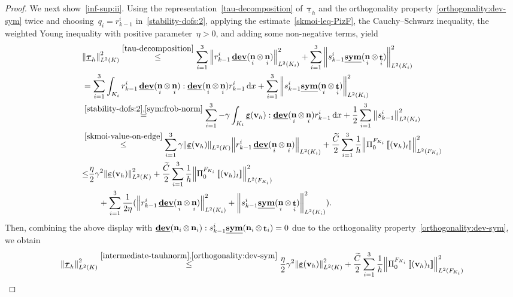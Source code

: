 \documentclass[a4paper,twoside,10pt]{article}
\theoremstyle{plain}
\theoremstyle{remark}
\theoremstyle{definition}
\numberwithin{equation}{section}
\numberwithin{figure}{section}
\newcommand{\Norm}[1]{{\left\|{#1} \right\|}}
\newcommand{\jump}[1]{\left[\!\left[#1\right]\!\right]}
\newcommand{\K}{K}
\newcommand{\F}{F}
\newcommand{\taubfh}{\underline{\boldsymbol{\tau}}_h}
\newcommand{\vbfh}{\mathbf{v}_h}
\DeclareMathOperator{\dev}{\underline{\mathbf{dev}}}
\newcommand{\sym}{\underline{\bf{sym}}}
\DeclareMathOperator{\norm}{\bf{n}}
\DeclareMathOperator{\tang}{\bf{t}}
\newcommand{\tangscalar}{t}
\newcommand{\Ltwo}{L^2}
\newcommand{\dx}{\, \mathrm{d}x}
\newcommand{\epsbfun}{\underline{\boldsymbol{\varepsilon}}}
\newcommand{\rkmoi}{r_{k-1}^i}
\newcommand{\skmoi}{s_{k-1}^i}
\newcommand{\Ki}{{\K_i}}
\newcommand{\Fi}{{\F_{\Ki}}}
\newcommand{\normi}{\norm_i}
\newcommand{\tangi}{\tang_i}
\newcommand{\PizFi}{\Pi_0^{\Fi}}
\newcommand{\Ctilde}{\widetilde{C}}
\newcommand{\qi}{q_{i}}
\begin{document}
\begin{proof}
We next show~\eqref{inf-sup:ii}.
Using the representation~\eqref{tau-decomposition} of~$\taubfh$
and the orthogonality property~\eqref{orthogonality:dev-sym} twice and
choosing~$\qi = \rkmoi$ in~\eqref{stability-dofs:2},
applying
the estimate~\eqref{skmoi-leq-PizF},
the Cauchy--Schwarz inequality,
the weighted Young inequality with positive parameter~$\eta >0$,
and adding some non-negative terms,
yield
\begin{equation} \label{intermediate-tauhnorm}
\begin{split}
&\Norm{\taubfh}_{\Ltwo(\K)}^2
\overset{\eqref{tau-decomposition}}{\leq}
\sum_{i=1}^3 \Norm{\rkmoi\dev(\normi\otimes\normi)}_{\Ltwo(\Ki)}^2 + \sum_{i=1}^3\Norm{\skmoi\sym(\normi\otimes\tangi)}_{\Ltwo(\Ki)}^2 \\
&= \sum_{i=1}^3 \int_{\Ki}\rkmoi\dev(\normi\otimes\normi):\dev(\normi\otimes\normi)\rkmoi\dx + \sum_{i=1}^3\Norm{\skmoi\sym(\normi\otimes\tangi)}_{\Ltwo(\Ki)}^2 \\
&\overset{\eqref{stability-dofs:2},\eqref{sym:frob-norm}}{=}
\sum_{i=1}^3 - \gamma\int_{\Ki} \epsbfun(\vbfh):\dev(\normi\otimes\normi)\rkmoi \dx
    + \frac12\sum_{i=1}^3 \Norm{\skmoi}_{\Ltwo(\Ki)}^2 \\
&\overset{\eqref{skmoi-value-on-edge}}{\leq}
\sum_{i=1}^3 \gamma\Norm{\epsbfun(\vbfh)}_{\Ltwo(\K)} \Norm{\rkmoi \dev(\normi\otimes\normi)}_{\Ltwo(\Ki)}
    +  \frac{\Ctilde}{2}\sum_{i=1}^3\frac{1}{h} \Norm{\PizFi\jump{(\vbfh)_{\tangscalar}}}^2_{\Ltwo(\Fi)} \\
&{\leq}
\frac{\eta}{2}\gamma^2\Norm{\epsbfun(\vbfh)}^2_{\Ltwo(\K)}
    +  \frac{\Ctilde}{2}\sum_{i=1}^3 \frac{1}{h} \Norm{\PizFi\jump{(\vbfh)_{\tangscalar}}}^2_{\Ltwo(\Fi)} \\
&\qquad    + \sum_{i=1}^3 \frac{1}{2\eta}(\Norm{\rkmoi \dev(\normi\otimes\normi)}^2_{\Ltwo(\Ki)}
        + \Norm{\skmoi \sym(\normi\otimes\tangi)}^2_{\Ltwo(\Ki)}).
\end{split}
\end{equation}
Then,
combining the above display
with
$\dev(\normi\otimes\normi) : \skmoi \sym(\normi\otimes\tangi)= 0$
due to the orthogonality property~\eqref{orthogonality:dev-sym},
we obtain
\begin{equation*}
\begin{split}
\Norm{\taubfh}_{\Ltwo(\K)}^2
&\overset{\eqref{intermediate-tauhnorm},\eqref{orthogonality:dev-sym}}{\leq}
\frac{\eta}{2}\gamma^2\Norm{\epsbfun(\vbfh)}^2_{\Ltwo(\K)}
    +  \frac{\Ctilde}{2}\sum_{i=1}^3 \frac{1}{h} \Norm{\PizFi\jump{(\vbfh)_{\tangscalar}}}^2_{\Ltwo(\Fi)} \\

\end{split}
\end{equation*}
\end{proof}
\end{document}
